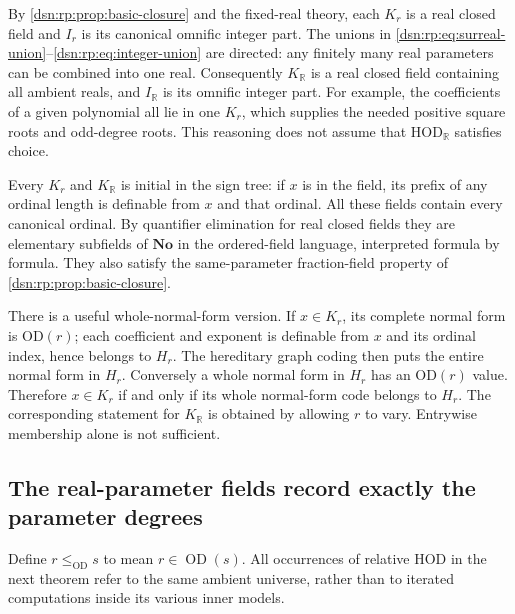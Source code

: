 \documentclass[11pt,a4paper]{article}
\numberwithin{equation}{section}
\theoremstyle{definition}
\theoremstyle{remark}
\newcommand{\No}{\mathbf{No}}
\newcommand{\HOD}{\mathrm{HOD}}
\newcommand{\R}{\mathbb R}
\newcommand{\HR}{\HOD_{\R}}
\newcommand{\KR}{K_{\R}}
\newcommand{\IR}{I_{\R}}
\begin{document}
By \cref{dsn:rp:prop:basic-closure} and the fixed-real theory, each $K_r$ is a real closed field and $I_r$ is
its canonical omnific integer part.  The unions in
\eqref{dsn:rp:eq:surreal-union}--\eqref{dsn:rp:eq:integer-union} are directed:
any finitely many real parameters can be combined into one real.
Consequently $\KR$ is a real closed field containing all
ambient reals, and $\IR$ is its omnific integer part.  For
example, the coefficients of a given polynomial all lie in one $K_r$,
which supplies the needed positive square roots and odd-degree roots.
This reasoning does not assume that $\HR$ satisfies choice.

Every $K_r$ and $\KR$ is initial in the sign tree: if $x$ is in the
field, its prefix of any ordinal length is definable from $x$ and that
ordinal. All these fields contain every canonical ordinal. By
quantifier elimination for real closed fields they are elementary
subfields of $\No$ in the ordered-field language, interpreted
formula by formula. They also satisfy the same-parameter fraction-field
property of \cref{dsn:rp:prop:basic-closure}.

There is a useful whole-normal-form version. If $x\in K_r$, its
complete normal form is OD$(r)$; each coefficient and exponent is
definable from $x$ and its ordinal index, hence belongs to $H_r$.
The hereditary graph coding then puts the entire normal form in
$H_r$. Conversely a whole normal form in $H_r$ has an OD$(r)$ value.
Therefore $x\in K_r$ if and only if its whole normal-form code belongs
to $H_r$. The corresponding statement for $\KR$ is obtained by
allowing $r$ to vary. Entrywise membership alone is not sufficient.

\subsection{The real-parameter fields record exactly the parameter degrees}

Define $r\leq_{\mathrm{OD}}s$ to mean $r\in\operatorname{OD}(s)$.
All occurrences of relative HOD in the next theorem refer to the same
ambient universe, rather than to iterated computations inside its
various inner models.
\end{document}
